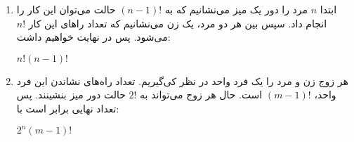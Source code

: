 \begin{enumerate}
  \item 
      ابتدا $n$ 
      مرد را دور یک میز می‌نشانیم که به 
      $(n-1)!$ حالت می‌توان این کار را انجام داد. سپس بین هر دو مرد، یک زن می‌نشانیم که تعداد را‌های این کار 
      $n!$ می‌شود. پس در نهایت خواهیم داشت:
      \begin{center}
        $n!(n-1)!$
      \end{center}

  \item 
    هر زوج زن و مرد را یک فرد واحد در نظر کی‌گیریم. تعداد راه‌های نشاندن این فرد واحد، 
    $(m-1)!$ است. حال هر زوج می‌تواند به 
    $2!$ حالت دور میز بنشینند. پس تعداد نهایی برابر است با:
    \begin{center}
      ${2^n}(m-1)!$
    \end{center}
\end{enumerate}